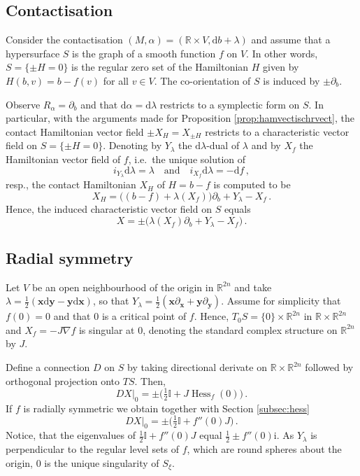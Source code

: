 \documentclass{amsart}
\theoremstyle{definition}
\newcommand{\rmd}{\mathrm d}
\newcommand{\rmi}{\mathrm i}
\newcommand{\R}{\mathbb R}
\newcommand{\bfx}{\mathbf x}
\newcommand{\bfy}{\mathbf y}
\DeclareMathOperator{\Hess}{\mathrm{Hess}}
\begin{document}

\subsection{Contactisation\label{subsec:contactisation}}


Consider the contactisation $(M,\alpha)=(\R\times V,\rmd b+\lambda)$
and assume that a hypersurface $S$ is the graph
of a smooth function $f$ on $V$.
In other words,
$S=\{\pm H=0\}$ is the regular zero set
of the Hamiltonian $H$ given by $H(b,v)=b-f(v)$ for all $v\in V$.
The co-orientation of $S$ is induced by $\pm\partial_b$.

Observe $R_{\alpha}=\partial_b$
and that $\rmd\alpha=\rmd\lambda$
restricts to a symplectic form on $S$.
In particular,
with the arguments made for Proposition \ref{prop:hamvectischrvect},
the contact Hamiltonian vector field $\pm X_{H}=X_{\pm H}$
restricts to a characteristic vector field on $S=\{\pm H=0\}$.
Denoting by $Y_{\lambda}$ the $\rmd\lambda$-dual of $\lambda$
and by $X_f$ the Hamiltonian vector field of $f$,
i.e.\ the unique solution of
\[
i_{Y_{\lambda}}\rmd\lambda=\lambda
\quad\text{and}\quad
i_{X_f}\rmd\lambda=-\rmd f
\,,
\]
resp.,
the contact Hamiltonian $X_H$ of $H=b-f$ is computed to be
\[
X_H=\big((b-f)+\lambda(X_f)\big)\partial_b+Y_{\lambda}-X_f
\,.
\]
Hence,
the induced characteristic vector field on $S$
equals
\[
X=\pm\big(\lambda(X_f)\partial_b+Y_{\lambda}-X_f\big)
\,.
\]




\subsection{Radial symmetry\label{subsec:radsymm}}


Let $V$ be an open neighbourhood of the origin in $\R^{2n}$
and take $\lambda=\tfrac12(\bfx\rmd\bfy-\bfy\rmd\bfx)$,
so that $Y_{\lambda}=\tfrac12(\bfx\partial_{\bfx}+\bfy\partial_{\bfy})$.
Assume for simplicity that $f(0)=0$
and that $0$ is a critical point of $f$.
Hence,
$T_0S=\{0\}\times\R^{2n}$ in $\R\times\R^{2n}$
and
$X_f=-J\nabla f$ is singular at $0$,
denoting the standard complex structure on $\R^{2n}$ by $J$.
 
Define a connection $D$ on $S$ 
by taking directional derivate on $\R\times\R^{2n}$
followed by orthogonal projection onto $TS$.
Then,
\[
DX|_0=\pm\big(\tfrac12\mathbb{I}+J\Hess_f(0)\big)
\,.
\]
If $f$ is radially symmetric we obtain
together with Section \ref{subsec:hess}
\[
DX|_0=\pm\big(\tfrac12\mathbb{I}+f''(0)J\big)
\,.
\]
Notice,
that the eigenvalues of $\tfrac12\mathbb{I}+f''(0)J$
equal $\frac12\pm f''(0)\rmi$.
As $Y_{\lambda}$ is perpendicular to the regular level sets of $f$,
which are round spheres about the origin,
$0$ is the unique singularity of $S_{\xi}$.
\end{document}
